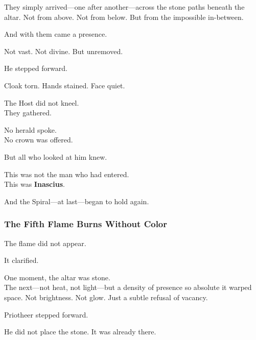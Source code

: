 \documentclass[12pt]{article}
\begin{document}
\vspace{0.5em}
They simply arrived---one after another---across the stone paths beneath the altar. Not from above. Not from below. But from the impossible in-between.

\vspace{0.5em}
And with them came a presence.

\vspace{0.5em}
Not vast. Not divine. But unremoved.

\vspace{0.5em}
He stepped forward.

\vspace{0.5em}
Cloak torn. Hands stained. Face quiet.

\vspace{0.5em}
The Host did not kneel.\\
They gathered.

\vspace{0.5em}
No herald spoke.\\
No crown was offered.

\vspace{0.5em}
But all who looked at him knew.

\vspace{0.5em}
This was not the man who had entered.\\
This was \textbf{Inascius}.

\vspace{0.5em}
And the Spiral---at last---began to hold again.

\dotfill

\subsubsection*{The Fifth Flame Burns Without Color}

The flame did not appear.

\vspace{0.5em}
It clarified.

\vspace{0.5em}
One moment, the altar was stone.\\
The next---not heat, not light---but a density of presence so absolute it warped space. Not brightness. Not glow. Just a subtle refusal of vacancy.

\vspace{0.5em}
Priotheer stepped forward.

\vspace{0.5em}
He did not place the stone. It was already there.
\end{document}
